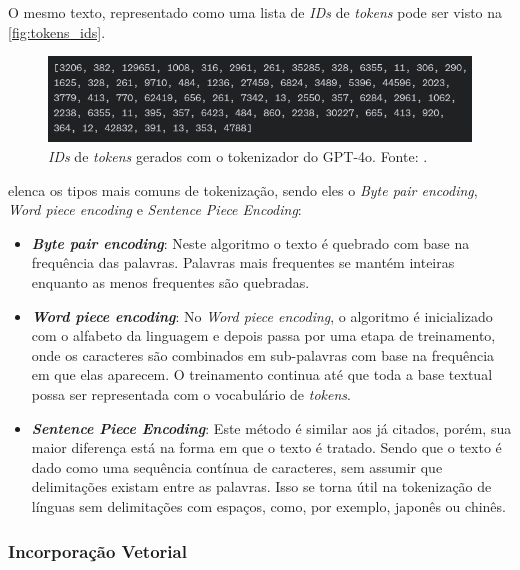O mesmo texto, representado como uma lista de \textit{IDs} de \textit{tokens} pode ser visto na \autoref{fig:tokens_ids}.

\begin{figure}[ht]
      \centering
      \includegraphics[width=0.7\columnwidth,keepaspectratio]{images/tokens_ids.png}
      \caption{\small \textit{IDs} de \textit{tokens} gerados com o tokenizador do \ac{GPT}-4o. Fonte: \textcite{tokenizer}.}
      \label{fig:tokens_ids}
\end{figure}

\textcite{llm_survey_2024} elenca os tipos mais comuns de tokenização, sendo eles o \textit{Byte pair encoding}, \textit{Word piece encoding} e
\textit{Sentence Piece Encoding}:

\begin{itemize}
      \item \textbf{\textit{Byte pair encoding}}: Neste algoritmo o texto é quebrado com base na frequência das palavras. Palavras mais frequentes se mantém inteiras
            enquanto as menos frequentes são quebradas.
      \item \textbf{\textit{Word piece encoding}}: No \textit{Word piece encoding}, o algoritmo é inicializado com o alfabeto da linguagem e depois passa por uma etapa
            de treinamento, onde os caracteres são combinados em sub-palavras com base na frequência em que elas aparecem. O treinamento continua até que toda a base
            textual possa ser representada com o vocabulário de \textit{tokens}.
      \item \textbf{\textit{Sentence Piece Encoding}}: Este método é similar aos já citados, porém, sua maior diferença está na forma em que o texto é tratado. Sendo
            que o texto é dado como uma sequência contínua de caracteres, sem assumir que delimitações existam entre as palavras. Isso se torna útil na tokenização de
            línguas sem delimitações com espaços, como, por exemplo, japonês ou chinês.
\end{itemize}

\subsubsection{Incorporação Vetorial}

